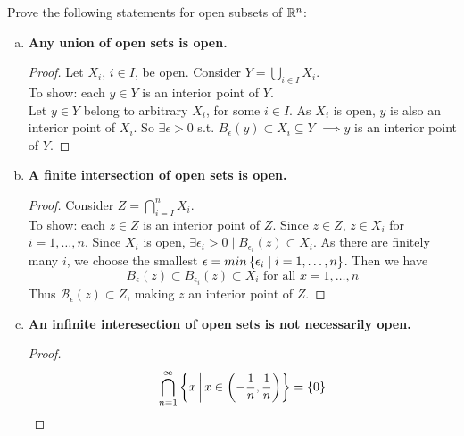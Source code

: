  Prove the following statements for open subsets of $\mathbb{R}^n$:
\begin{enumerate}[a.]
  \item \textbf{Any union of open sets is open.} \\
  \begin{proof}
    Let $X_i$, $i \in I$, be open. Consider $Y = \bigcup_{i\in I}X_i$. \\
    To show: each $y \in Y$ is an interior point of $Y$. \\
    Let $y\in Y$ belong to arbitrary $X_i$, for some $i\in I$. As $X_i$ is open, $y$ is also an interior point of $X_i$. So $\exists \epsilon > 0$ s.t. $B_\epsilon (y) \subset X_i \subseteq Y$ $\implies y$ is an interior point of $Y$.
  \end{proof}
  \item \textbf{A finite intersection of open sets is open.} \\
  \begin{proof}
    Consider $Z = \bigcap^n_{i=I}X_i$. \\
    To show: each $z\in Z$ is an interior point of $Z$. Since $z\in Z$, $z\in X_i$ for $i=1,\dots,n$. Since $X_i$ is open, $\exists\epsilon_i > 0 \mid B_{\epsilon_i}(z) \subset X_i$. As there are finitely many $i$, we choose the smallest $\epsilon=min\left\{ \epsilon_i \mid i = 1,\dots,n \right\}$. Then we have
    \[B_\epsilon (z) \subset B_{\epsilon_i}(z) \subset X_i \text{ for all } x=1,\dots,n\]
    Thus $\mathcal{B}_\epsilon (z)\subset Z$, making $z$ an interior point of $Z$.
  \end{proof}

  \item\textbf{An infinite interesection of open sets is not necessarily open.}
  \begin{proof}
    \[\bigcap_{n=1}^{\infty} \left\{ x \,\middle\vert\, x\in \left(-\frac{1}{n}, \frac{1}{n}\right) \right\}=\left\{ 0 \right\}\]
  \end{proof}
\end{enumerate}
